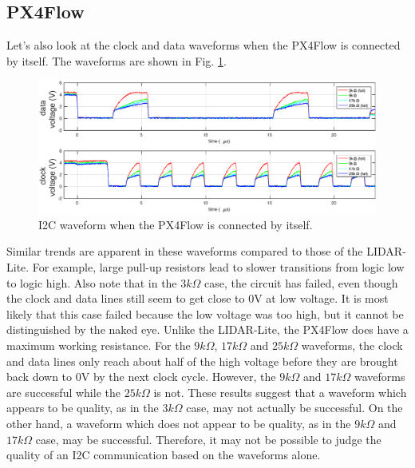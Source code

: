 \documentclass[10pt]{article}
\begin{document}
\subsection*{PX4Flow}

Let's also look at the clock and data waveforms when the PX4Flow is connected by itself. The waveforms are shown in Fig. \ref{fig:PX}.
\begin{figure}[ht]
\centering

\includegraphics[width=1.0\textwidth]{../2pt5microsec/PX_cropped.eps}
\caption{I2C waveform when the PX4Flow is connected by itself.}
\label{fig:PX}
\end{figure}
Similar trends are apparent in these waveforms compared to those of the LIDAR-Lite. For example, large pull-up resistors lead to slower transitions from logic low to logic high. Also note that in the $3 k \Omega$ case, the circuit has failed, even though the clock and data lines still seem to get close to 0V at low voltage. It is most likely that this case failed because the low voltage was too high, but it cannot be distinguished by the naked eye. Unlike the LIDAR-Lite, the PX4Flow does have a maximum working resistance. For the $9 k \Omega$, $17 k \Omega$ and $25 k \Omega$ waveforms, the clock and data lines only reach about half of the high voltage before they are brought back down to 0V by the next clock cycle. However, the $9 k \Omega$ and $17 k \Omega$ waveforms are successful while the $25 k \Omega$ is not. These results suggest that a waveform which appears to be quality, as in the $3 k \Omega$ case, may not actually be successful. On the other hand, a waveform which does not appear to be quality, as in the $9 k \Omega$ and $17 k \Omega$ case, may be successful. Therefore, it may not be possible to judge the quality of an I2C communication based on the waveforms alone.
\end{document}
